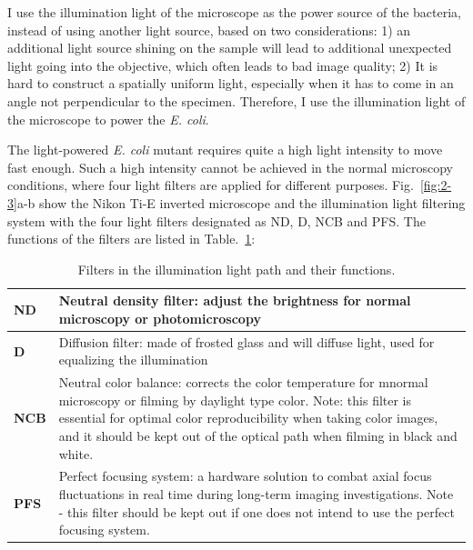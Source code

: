 I use the illumination light of the microscope as the power source of the bacteria, instead of using another light source, based on two considerations: 1) an additional light source shining on the sample will lead to additional unexpected light going into the objective, which often leads to bad image quality; 2) It is hard to construct a spatially uniform light, especially when it has to come in an angle not perpendicular to the specimen. Therefore, I use the illumination light of the microscope to power the \textit{E. coli}.

The light-powered \textit{E. coli} mutant requires quite a high light intensity to move fast enough. Such a high intensity cannot be achieved in the normal microscopy conditions, where four light filters are applied for different purposes. Fig.~\ref{fig:2-3}a-b show the Nikon Ti-E inverted microscope and the illumination light filtering system with the four light filters designated as ND, D, NCB and PFS. The functions of the filters are listed in Table.~\ref{table:2-1}:

\begin{table}[h]
	\centering
	\begin{tabular}{ | p{0.4in} | p{5in} |}
		\hline
		\textbf{ND} & Neutral density filter: adjust the brightness for normal microscopy or photomicroscopy \\
		\hline
		\textbf{D} & Diffusion filter: made of frosted glass and will diffuse light, used for equalizing the illumination \\
		\hline
		\textbf{NCB} & Neutral color balance: corrects the color temperature for mnormal microscopy or filming by daylight type color. Note: this filter is essential for optimal color reproducibility when taking color images, and it should be kept out of the optical path when filming in black and white. \\
		\hline
		\textbf{PFS} & Perfect focusing system: a hardware solution to combat axial focus fluctuations in real time during long-term imaging investigations. Note - this filter should be kept out if one does not intend to use the perfect focusing system.\\
		\hline
	\end{tabular}
	\caption[Filters in the illumination light path and their functions.]{Filters in the illumination light path and their functions.}
	\label{table:2-1}
\end{table}

